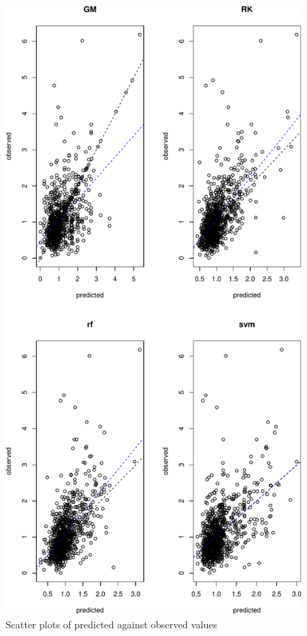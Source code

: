 \documentclass[10pt,b5paper,]{book}
\theoremstyle{definition}
\theoremstyle{definition}
\theoremstyle{definition}
\theoremstyle{remark}
\begin{document}
\begin{figure}
\centering
\includegraphics{SOCMapping_files/figure-latex/unnamed-chunk-86-1.pdf}
\caption{\label{fig:unnamed-chunk-86}Scatter plots of predicted against
observed values}
\end{figure}
\end{document}
